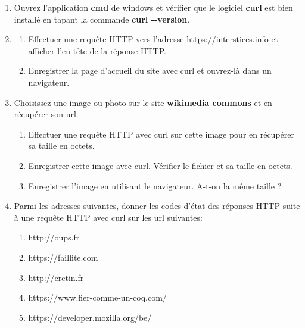 \documentclass[11pt,a4paper]{article}
\newcounter{numexo}
\begin{document}
\begin{enumerate}
\item Ouvrez l'application \textbf{cmd} de windows et vérifier que le logiciel \textbf{curl} est bien installé en tapant la commande \textbf{curl -{}-version}.
\item \begin{enumerate}
\item Effectuer une requête HTTP vers l'adresse https://interstices.info et afficher l'en-tête de la réponse HTTP.
\item Enregistrer la page d'accueil du site avec curl et ouvrez-là dans un navigateur.
\end{enumerate}
\item Choisissez une image ou photo sur le site \textbf{wikimedia commons} et en récupérer son url.
\begin{enumerate}
\item Effectuer une requête HTTP avec curl sur cette image pour en récupérer sa taille en octets.
\item Enregistrer cette image avec curl. Vérifier le fichier et sa taille en octets.
\item Enregistrer l'image en utilisant le navigateur. A-t-on la même taille ?
\end{enumerate}
\item Parmi les adresses suivantes, donner les codes d'état des réponses HTTP suite à une requête HTTP avec curl sur les url suivantes:
\begin{enumerate}
\item http://oups.fr
\item https://faillite.com
\item http://cretin.fr
\item https://www.fier-comme-un-coq.com/
\item https://developer.mozilla.org/be/
\end{enumerate}
\end{enumerate}


\addtocounter{numexo}{1}
\end{document}
